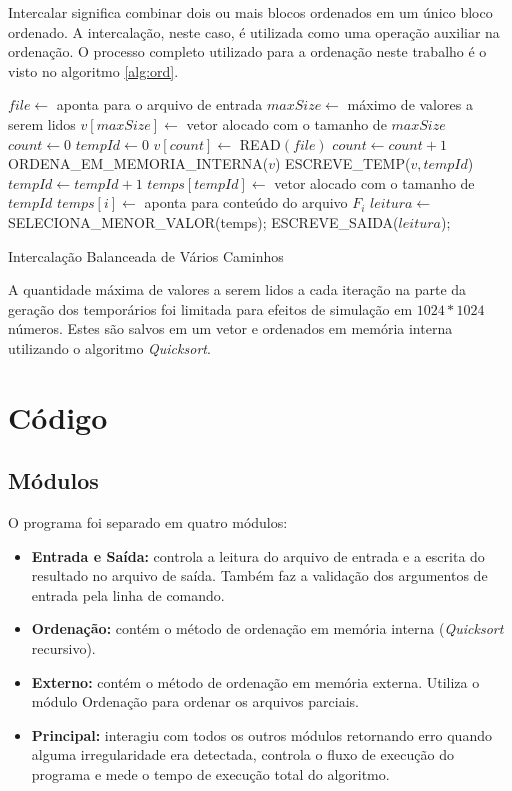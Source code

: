 \documentclass[12pt]{article}
\begin{document}
Intercalar significa combinar dois ou mais blocos ordenados em um único bloco ordenado.
A intercalação, neste caso, é utilizada como uma operação auxiliar na ordenação. O 
processo completo utilizado para a ordenação neste trabalho é o visto no algoritmo 
\ref{alg:ord}.

\begin{algorithm}[h!]
\label{alg:ord}
\begin{footnotesize}

$file \longleftarrow$ aponta para o arquivo de entrada\;
$maxSize \longleftarrow$ máximo de valores a serem lidos\;
$v[maxSize] \longleftarrow$ vetor alocado com o tamanho de $maxSize$\;
$count \longleftarrow 0$\;
$tempId \longleftarrow 0$\;
{
	{
		$v[count] \longleftarrow$ READ$(file)$\;
		$count \longleftarrow count + 1$\;
	}
	ORDENA\_EM\_MEMORIA\_INTERNA($v$)\;
	ESCREVE\_TEMP($v, tempId$)\;
	$tempId \longleftarrow tempId + 1$\;
}
$temps[tempId] \longleftarrow$ vetor alocado com o tamanho de $tempId$\;
{
	$temps[i] \longleftarrow$ aponta para conteúdo do arquivo $F_{i}$\;
}
{
	$leitura \longleftarrow$ SELECIONA\_MENOR\_VALOR(temps);
	ESCREVE\_SAIDA($leitura$);
}

\caption{Intercalação Balanceada de Vários Caminhos}
\end{footnotesize}
\end{algorithm}

A quantidade máxima de valores a serem lidos a cada iteração na parte da geração
dos temporários foi limitada para efeitos de simulação em $1024 * 1024$ números.
Estes são salvos em um vetor e ordenados em memória interna utilizando o algoritmo
\textit{Quicksort}.

\section{Código}

\subsection{Módulos}
O programa foi separado em quatro módulos:
\begin{itemize}
\item \textbf{Entrada e Saída:} controla a leitura do arquivo de entrada
e a escrita do resultado no arquivo de saída. Também faz a validação dos 
argumentos de entrada pela linha de comando.
\item \textbf{Ordenação:} contém o método de ordenação em memória interna 
(\textit{Quicksort} recursivo).
\item \textbf{Externo:} contém o método de ordenação em memória externa. Utiliza
o módulo Ordenação para ordenar os arquivos parciais.
\item \textbf{Principal:} interagiu com todos os outros módulos retornando erro
quando alguma irregularidade era detectada, controla o fluxo de execução do
programa e mede o tempo de execução total do algoritmo.
\end{itemize}
\end{document}
